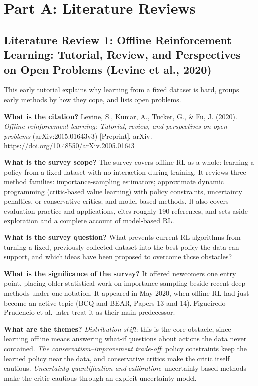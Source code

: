 \documentclass[11pt]{article}
\newcommand{\paper}[1]{\subsection*{#1}}
\newcommand{\q}[2]{\item \textbf{#1} #2}
\begin{document}
\section*{Part A: Literature Reviews}

\paper{Literature Review 1: Offline Reinforcement Learning: Tutorial, Review, and Perspectives on Open Problems (Levine et al., 2020)}
This early tutorial explains why learning from a fixed dataset is hard, groups early methods by how they cope, and lists open problems.
\begin{qna}

\q{What is the citation?}
Levine, S., Kumar, A., Tucker, G., \& Fu, J. (2020). \emph{Offline reinforcement learning: Tutorial, review, and perspectives on open problems} (arXiv:2005.01643v3) [Preprint]. arXiv. \url{https://doi.org/10.48550/arXiv.2005.01643}

\q{What is the survey scope?}
The survey covers offline RL as a whole: learning a policy from a fixed dataset with no interaction during training. It reviews three method families: importance-sampling estimators; approximate dynamic programming (critic-based value learning) with policy constraints, uncertainty penalties, or conservative critics; and model-based methods. It also covers evaluation practice and applications, cites roughly 190 references, and sets aside exploration and a complete account of model-based RL.

\q{What is the survey question?}
What prevents current RL algorithms from turning a fixed, previously collected dataset into the best policy the data can support, and which ideas have been proposed to overcome those obstacles?

\q{What is the significance of the survey?}
It offered newcomers one entry point, placing older statistical work on importance sampling beside recent deep methods under one notation. It appeared in May 2020, when offline RL had just become an active topic (BCQ and BEAR, Papers 13 and 14). Figueiredo Prudencio et al.\ later treat it as their main predecessor.

\q{What are the themes?}
\emph{Distribution shift}: this is the core obstacle, since learning offline means answering what-if questions about actions the data never contained. \emph{The conservatism--improvement trade-off}: policy constraints keep the learned policy near the data, and conservative critics make the critic itself cautious. \emph{Uncertainty quantification and calibration}: uncertainty-based methods make the critic cautious through an explicit uncertainty model.


\end{qna}
\end{document}
